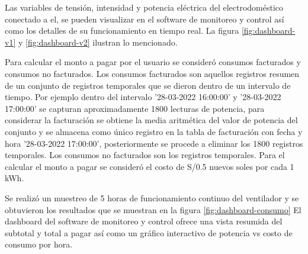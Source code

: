Las variables de tensión, intensidad y potencia eléctrica del electrodoméstico conectado a el, se pueden visualizar en el software de monitoreo y control así como los detalles de su funcionamiento en tiempo real. La figura \ref{fig:dashboard-v1} y \ref{fig:dashboard-v2} ilustran lo mencionado.

Para calcular el monto a pagar por el usuario se consideró consumos facturados y consumos no facturados. Los consumos facturados son aquellos registros resumen de un conjunto de registros temporales que se dieron dentro de un intervalo de tiempo. Por ejemplo dentro del intervalo '28-03-2022 16:00:00' y '28-03-2022 17:00:00' se capturan aproximadamente 1800 lecturas de potencia, para considerar la facturación se obtiene la media aritmética del valor de potencia del conjunto y se almacena como único registro en la tabla de facturación con fecha y hora '28-03-2022 17:00:00', posteriormente se procede a eliminar los 1800 registros temporales. Los consumos no facturados son los registros temporales. Para el calcular el monto a pagar se consideró el costo de S/0.5 nuevos soles por cada 1 kWh.

Se realizó un muestreo de 5 horas de funcionamiento continuo del ventilador y se obtuvieron los resultados que se muestran en la figura \ref{fig:dashboard-consumo} El dashboard del software de monitoreo y control ofrece una vista resumida del subtotal y total a pagar así como un gráfico interactivo de potencia vs costo de consumo por hora.

